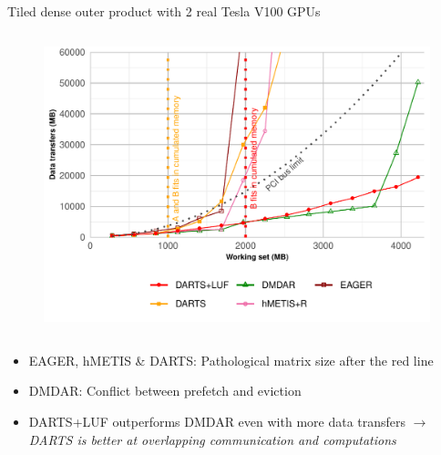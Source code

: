 \documentclass{libs/ufc_format}
\begin{document}
\begin{frame}{Tiled dense outer product with 2 real Tesla V100 GPUs}
\begin{columns}{}
        \begin{column}{0.5\textwidth}
	\begin{figure}
		\includegraphics[scale = 0.3]{Images/DT_dynamic_data_aware_no_hfp_gemini-2-ipdps_2GPU.pdf}
	\end{figure}
		\end{column}
		\end{columns}
	\begin{itemize}
		\item EAGER, hMETIS \& DARTS: Pathological matrix size after the red line
		\item DMDAR: Conflict between prefetch and eviction
		 \item DARTS+LUF outperforms DMDAR even with more data transfers $\rightarrow$ \emph{DARTS is better at 
		overlapping communication and computations}
	\end{itemize}
\end{frame}
\end{document}
